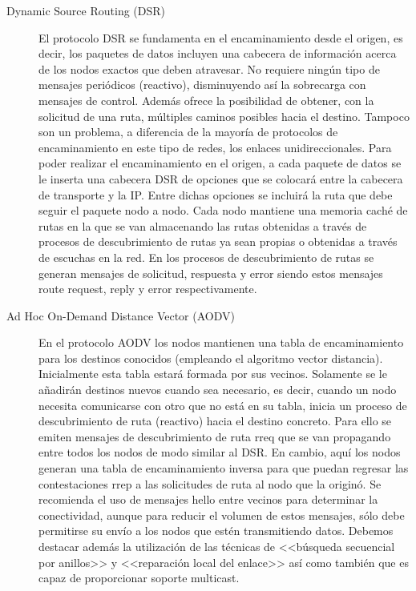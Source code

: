 \begin{description}
\item[Dynamic Source Routing (DSR)]
El protocolo DSR se fundamenta en el encaminamiento desde el origen, es decir, los
paquetes de datos incluyen una cabecera de informaci\'on acerca de los nodos exactos que deben atravesar. No requiere
ning\'un tipo de mensajes peri\'odicos (reactivo), disminuyendo as\'i la sobrecarga con mensajes de control. Adem\'as ofrece la
posibilidad de obtener, con la solicitud de una ruta, m\'ultiples caminos posibles hacia el destino. Tampoco son un
problema, a diferencia de la mayor\'ia de protocolos de encaminamiento en este tipo de redes, los enlaces
unidireccionales. Para poder realizar el encaminamiento en el origen, a cada paquete de datos se le inserta una
cabecera DSR de opciones que se colocar\'a entre la cabecera de transporte y la IP. Entre dichas opciones se incluir\'a la
ruta que debe seguir el paquete nodo a nodo. Cada nodo mantiene una memoria cach\'e de rutas en la que se van almacenando
las rutas obtenidas a trav\'es de procesos de descubrimiento de rutas ya sean propias o obtenidas a trav\'es de escuchas en
la red. En los procesos de descubrimiento de rutas se generan mensajes de solicitud, respuesta y error siendo estos
mensajes route request, reply y error respectivamente. 

\item[Ad Hoc On-Demand Distance Vector (AODV)]
En el protocolo AODV los nodos mantienen una tabla de encaminamiento para
los destinos conocidos (empleando el algoritmo vector distancia). Inicialmente esta tabla estar\'a formada por sus
vecinos. Solamente se le a\~nadir\'an destinos nuevos cuando sea necesario, es decir, cuando un nodo necesita comunicarse
con otro que no est\'a en su tabla, inicia un proceso de descubrimiento de ruta (reactivo) hacia el destino concreto.
Para ello se emiten mensajes de descubrimiento de ruta rreq que se van propagando entre todos los nodos de
modo similar al DSR. En cambio, aqu\'i los nodos generan una tabla de encaminamiento inversa para que puedan regresar las
contestaciones rrep a las solicitudes de ruta al nodo que la origin\'o. Se recomienda el uso de mensajes
hello entre vecinos para determinar la conectividad, aunque para reducir el volumen de estos mensajes, s\'olo
debe permitirse su env\'io a los nodos que est\'en transmitiendo datos. Debemos destacar adem\'as la utilizaci\'on de las
t\'ecnicas de <<b\'usqueda secuencial por anillos>> y <<reparaci\'on local del
enlace>> as\'i como tambi\'en que es capaz de proporcionar soporte multicast.
\end{description}

